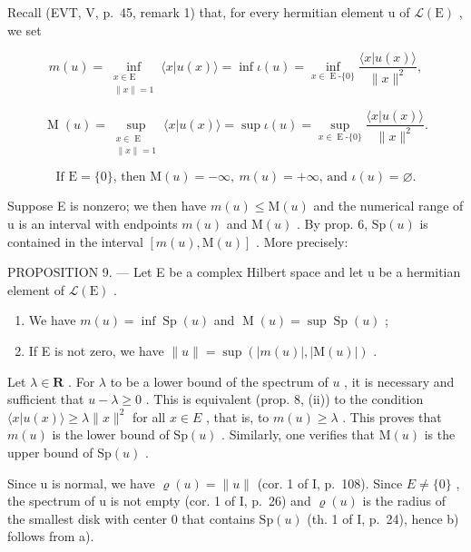 Recall (EVT, V, p.~45, remark 1) that, for every hermitian element u of \(\mathcal{L}(\mathrm{E})\) , we set

\[
m(u) = \inf_{\substack{x\in \mathrm{E}\\ \| x\| = 1}}\langle x|u(x)\rangle = \inf \iota (u) = \inf_{x\in \operatorname{E}\text{-}\{0\}}\frac{\langle x|u(x)\rangle}{\|x\|^ {2}},
\]

\[
\operatorname{M}(u) = \sup_{\substack{x\in \operatorname{E}\\ \| x\| = 1}}\langle x|u(x)\rangle = \sup \iota (u) = \sup_{x\in \operatorname{E}\text{-}\{0\}}\frac{\langle x|u(x)\rangle}{\|x\|^ {2}}.
\]

\[
\text{If } \mathrm{E} = \{0\}\text{, then } \mathrm{M}(u) = -\infty,\ m(u) = +\infty\text{, and } \iota(u) = \varnothing.
\]

Suppose E is nonzero; we then have \(m(u) \leqslant \mathrm{M}(u)\) and the numerical range of u is an interval with endpoints \(m(u)\) and \(\mathrm{M}(u)\) . By prop. 6, \(\mathrm{Sp}(u)\) is contained in the interval \([m(u), \mathrm{M}(u)]\) . More precisely:

PROPOSITION 9. --- Let E be a complex Hilbert space and let u be a hermitian element of \(\mathcal{L}(\mathrm{E})\) .

\begin{enumerate}
\def\labelenumi{\alph{enumi})}
\item
  We have \(m(u) = \inf \operatorname{Sp}(u)\) and \(\operatorname{M}(u) = \sup \operatorname{Sp}(u)\) ;
\item
  If E is not zero, we have \(\|u\|=\sup(|m(u)|,|\mathrm{M}(u)|)\) .
\end{enumerate}

Let \(\lambda \in \mathbf{R}\) . For \(\lambda\) to be a lower bound of the spectrum of \(u\) , it is necessary and sufficient that \(u - \lambda \geqslant 0\) . This is equivalent (prop. 8, (ii)) to the condition \(\langle x|u(x)\rangle \geqslant \lambda \|x\|^2\) for all \(x \in E\) , that is, to \(m(u) \geqslant \lambda\) . This proves that \(m(u)\) is the lower bound of \(\mathrm{Sp}(u)\) . Similarly, one verifies that \(\mathrm{M}(u)\) is the upper bound of \(\mathrm{Sp}(u)\) .

Since u is normal, we have \(\varrho(u)=\|u\|\) (cor. 1 of I, p.~108). Since \(E\neq\{0\}\) , the spectrum of u is not empty (cor. 1 of I, p.~26) and \(\varrho(u)\) is the radius of the smallest disk with center 0 that contains \(\mathrm{Sp}(u)\) (th. 1 of I, p.~24), hence b) follows from a).

